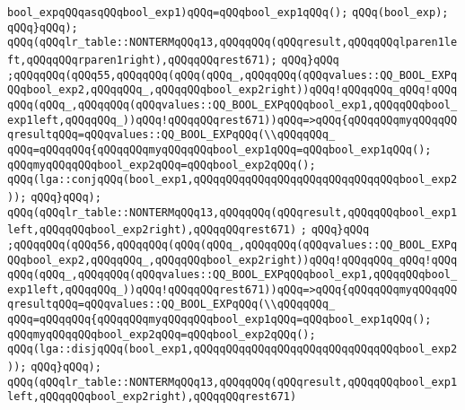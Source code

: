 \verb|bool_expqQQqasqQQqbool_exp1)qQQq=qQQqbool_exp1qQQq();|\newline
\verb|qQQq(bool_exp);|\newline
\verb|qQQq}qQQq);|\newline
\verb|qQQq(qQQqlr_table::NONTERMqQQq13,qQQqqQQq(qQQqresult,qQQqqQQqlparen1left,qQQqqQQqrparen1right),qQQqqQQqrest671);|\newline
\verb|qQQq}qQQq|\newline
\verb|;qQQqqQQq(qQQq55,qQQqqQQq(qQQq(qQQq_,qQQqqQQq(qQQqvalues::QQ_BOOL_EXPqQQqbool_exp2,qQQqqQQq_,qQQqqQQqbool_exp2right))qQQq!qQQqqQQq_qQQq!qQQqqQQq(qQQq_,qQQqqQQq(qQQqvalues::QQ_BOOL_EXPqQQqbool_exp1,qQQqqQQqbool_exp1left,qQQqqQQq_))qQQq!qQQqqQQqrest671))qQQq=>qQQq{qQQqqQQqmyqQQqqQQqresultqQQq=qQQqvalues::QQ_BOOL_EXPqQQq(\\qQQqqQQq_|\newline
\verb|qQQq=qQQqqQQq{qQQqqQQqmyqQQqqQQqbool_exp1qQQq=qQQqbool_exp1qQQq();|\newline
\verb|qQQqmyqQQqqQQqbool_exp2qQQq=qQQqbool_exp2qQQq();|\newline
\verb|qQQq(lga::conjqQQq(bool_exp1,qQQqqQQqqQQqqQQqqQQqqQQqqQQqqQQqbool_exp2));|\newline
\verb|qQQq}qQQq);|\newline
\verb|qQQq(qQQqlr_table::NONTERMqQQq13,qQQqqQQq(qQQqresult,qQQqqQQqbool_exp1left,qQQqqQQqbool_exp2right),qQQqqQQqrest671)|\newline
\verb|;|\newline
\verb|qQQq}qQQq|\newline
\verb|;qQQqqQQq(qQQq56,qQQqqQQq(qQQq(qQQq_,qQQqqQQq(qQQqvalues::QQ_BOOL_EXPqQQqbool_exp2,qQQqqQQq_,qQQqqQQqbool_exp2right))qQQq!qQQqqQQq_qQQq!qQQqqQQq(qQQq_,qQQqqQQq(qQQqvalues::QQ_BOOL_EXPqQQqbool_exp1,qQQqqQQqbool_exp1left,qQQqqQQq_))qQQq!qQQqqQQqrest671))qQQq=>qQQq{qQQqqQQqmyqQQqqQQqresultqQQq=qQQqvalues::QQ_BOOL_EXPqQQq(\\qQQqqQQq_|\newline
\verb|qQQq=qQQqqQQq{qQQqqQQqmyqQQqqQQqbool_exp1qQQq=qQQqbool_exp1qQQq();|\newline
\verb|qQQqmyqQQqqQQqbool_exp2qQQq=qQQqbool_exp2qQQq();|\newline
\verb|qQQq(lga::disjqQQq(bool_exp1,qQQqqQQqqQQqqQQqqQQqqQQqqQQqqQQqbool_exp2));|\newline
\verb|qQQq}qQQq);|\newline
\verb|qQQq(qQQqlr_table::NONTERMqQQq13,qQQqqQQq(qQQqresult,qQQqqQQqbool_exp1left,qQQqqQQqbool_exp2right),qQQqqQQqrest671)|\newline
